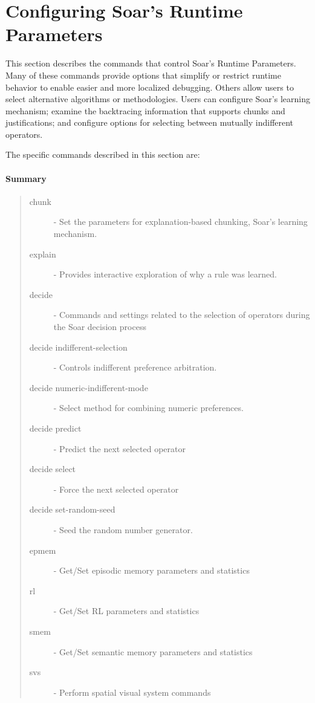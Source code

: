 \section{Configuring Soar's Runtime Parameters}
\label{RUNTIME}

This section describes the commands that control Soar's Runtime Parameters.
Many of these commands provide options that simplify or restrict 
runtime behavior to enable easier and more localized debugging.
Others allow users to select alternative algorithms or methodologies.
Users can configure Soar's learning mechanism; examine the
backtracing information that supports chunks and justifications;
and configure options for selecting between mutually indifferent operators.

The specific commands described in this section are:

\paragraph{Summary}
\begin{quote}
\begin{description}
\item[chunk] - Set the parameters for explanation-based chunking, Soar's learning mechanism.
\item[explain] - Provides interactive exploration of why a rule was learned.
\item[decide ] - Commands and settings related to the selection of operators during the Soar decision process
\item[decide indifferent-selection] -  Controls indifferent preference arbitration.
\item[decide numeric-indifferent-mode] - Select method for combining numeric preferences.
\item[decide predict] - Predict the next selected operator 
\item[decide select] - Force the next selected operator 
\item[decide set-random-seed] - Seed the random number generator.
\item[epmem] - Get/Set episodic memory parameters and statistics
\item[rl] - Get/Set RL parameters and statistics 
\item[smem] - Get/Set semantic memory parameters and statistics
\item[svs] - Perform spatial visual system commands
\end{description}
\end{quote}

